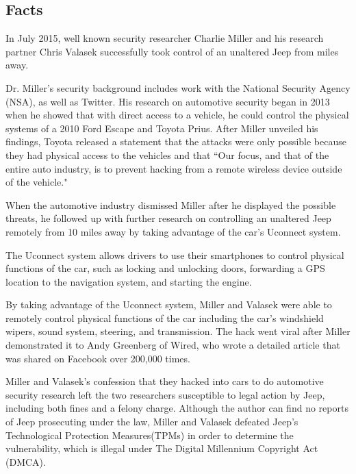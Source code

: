 \documentclass[12pt]{article}
\begin{document}
\tableofcontents
\newpage
\begin{multicols}{2}

\section{Facts}

In July 2015, well known security researcher Charlie Miller and his research partner Chris Valasek successfully took control of an unaltered Jeep from miles away. \cite{wired}

Dr. Miller's security background includes work with the National Security Agency (NSA), as well as Twitter. \cite{linkedin} His  research on automotive security began in 2013 when he showed that with direct access to a vehicle, he could control the physical systems of a 2010 Ford Escape and Toyota Prius. \cite{officialPaper} After Miller unveiled his findings, Toyota released a statement that the attacks were only possible because they had physical access to the vehicles and that ``Our focus, and that of the entire auto industry, is to prevent hacking from a remote wireless device outside of the vehicle." \cite{originalHack}

When the automotive industry dismissed Miller after he displayed the possible threats, he followed up with further research on controlling an unaltered Jeep remotely from 10 miles away by taking advantage of the car's Uconnect system. \cite{officialPaper} 

The Uconnect system allows drivers to use their smartphones to control physical functions of the car, such as locking and unlocking doors, forwarding a GPS location to the navigation system, and starting the engine.\cite{uconnect} 

By taking advantage of the Uconnect system, Miller and Valasek were able to remotely control physical functions of the car including the car's windshield wipers, sound system, steering, and transmission. \cite{wired} The hack went viral after Miller demonstrated it to Andy Greenberg of Wired, who wrote a detailed article that was shared on Facebook over 200,000 times.\cite{wired}

Miller and Valasek's confession that they hacked into cars to do automotive security research left the two researchers susceptible to legal action by Jeep, including both fines and a felony charge. \cite{brokeDMCA} Although the author can find no reports of Jeep prosecuting under the law, Miller and Valasek defeated Jeep's Technological Protection Measures(TPMs) in order to determine the vulnerability, which is illegal under The Digital Millennium Copyright Act (DMCA).\cite{DMCA} 


\end{multicols}
\end{document}
